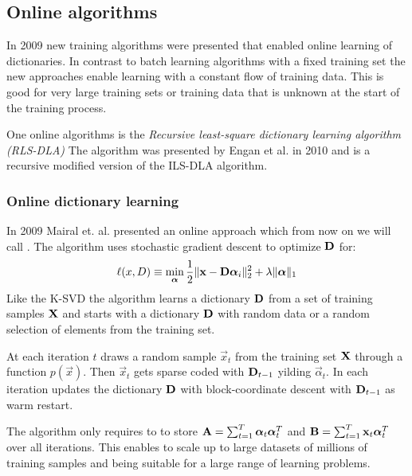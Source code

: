 \subsection{Online algorithms}
In 2009 new training algorithms were presented that enabled online learning of
dictionaries. In contrast to batch learning algorithms with a fixed training set
the new approaches enable learning with a constant flow of training data. This
is good for very large training sets or training data that is unknown at the
start of the training process.

One online algorithms is the \emph{Recursive least-square dictionary
learning algorithm (RLS-DLA)} The algorithm was presented by Engan et al. in
2010\cite{Engan2010} and is a recursive modified version of the ILS-DLA
algorithm.

\subsubsection{Online dictionary learning}
\label{sec:mairal}
In 2009 Mairal et. al.\cite{Mairal2009} presented an online approach which from
now on we will call \trainDL.
The algorithm uses stochastic gradient descent to optimize $\boldsymbol{\mathrm{D}}$ for: 
\begin{equation*}
\ell(x,D) \equiv \min_{\boldsymbol{\mathrm{\alpha}}} \frac{1}{2}\lVert \boldsymbol{\mathrm{x}} -
\boldsymbol{\mathrm{D}}\boldsymbol{\mathrm{\alpha}}_i \rVert^{2}_{2}  +  \lambda \lVert
\boldsymbol{\mathrm{\alpha}}
\rVert_{1} 
\end{equation*} 
Like the K-SVD the algorithm learns a dictionary $\boldsymbol{\mathrm{D}}$ from a set of
training samples $\boldsymbol{\mathrm{X}}$ and starts with a dictionary $\boldsymbol{\mathrm{D}}$ with random
data or a random selection of elements from the training set. 

At each iteration $t$  draws a random sample $\vec{x}_t$
from the training set $\boldsymbol{\mathrm{X}}$ through a function $p(\vec{x})$.
Then $\vec{x}_t$ gets sparse coded with $\boldsymbol{\mathrm{D}}_{t-1}$ yilding
$\vec{\alpha}_t$. In each iteration  updates the
dictionary $\boldsymbol{\mathrm{D}}$ with block-coordinate descent with $\boldsymbol{\mathrm{D}}_{t-1}$ as warm
restart.

The algorithm only requires to to store 
$\boldsymbol{\mathrm{A}}=\sum_{t=1}^T\boldsymbol{\mathrm{\alpha}}_t\boldsymbol{\mathrm{\alpha}}_t^T$ and
$\boldsymbol{\mathrm{B}}=\sum_{t=1}^T\boldsymbol{\mathrm{x}}_t\boldsymbol{\mathrm{\alpha}}_t^T$ over all iterations.
This enables to scale up to large datasets of millions of training samples
and being suitable for a large range of learning problems.

